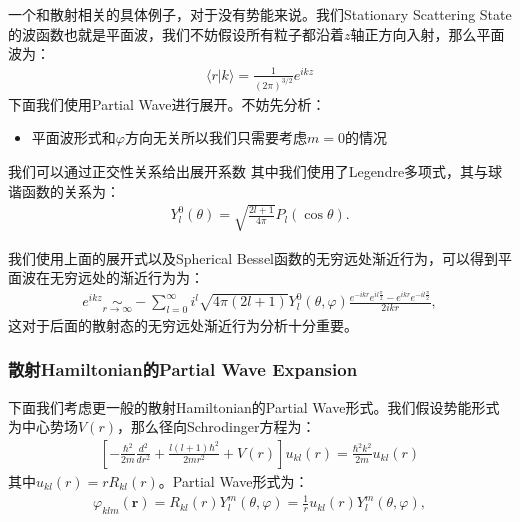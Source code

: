 一个和散射相关的具体例子，对于没有势能来说。我们Stationary Scattering
State的波函数也就是平面波，我们不妨假设所有粒子都沿着$ z $轴正方向入射，那么平面波为：
\begin{align}
  \langle r|k\rangle=\frac{1}{(2\pi)^{3/2}}e^{ikz}
\end{align}
下面我们使用Partial Wave进行展开。不妨先分析：
\begin{itemize}
  \item 平面波形式和$ \varphi $方向无关所以我们只需要考虑$ m=0 $的情况
\end{itemize}
我们可以通过正交性关系给出展开系数
其中我们使用了Legendre多项式，其与球谐函数的关系为：
\begin{align}
  Y_l^0(\theta)=\sqrt{\frac{2l+1}{4\pi}}P_l(\cos\theta).
\end{align}

\bigskip
{}

我们使用上面的展开式以及Spherical Bessel函数的无穷远处渐近行为，可以得到平面波在无穷远处的渐近行为为：
\begin{align}
  e^{ikz}\underset{r\to\infty}{\sim} - \sum_{l=0}^\infty
  i^l\sqrt{4\pi(2l+1)}
  Y^0_l(\theta,\varphi)\frac{e^{-ikr}e^{il\frac{\pi}{2}}-e^{ikr}e^{-il\frac{\pi}{2}}}{2ikr},
\end{align}
这对于后面的散射态的无穷远处渐近行为分析十分重要。

\subsubsection{散射Hamiltonian的Partial Wave Expansion}

\bigskip
{}

下面我们考虑更一般的散射Hamiltonian的Partial Wave形式。我们假设势能形式为中心势场$ V(r) $，那么径向Schrodinger方程为：
\begin{align}
  \left[-\frac{\hbar^{2}}{2m}\frac{d^{2}}{dr^{2}}+\frac{l(l+1)\hbar^{2}}{2m
  r^{2}}+V(r)\right]u_{kl}(r)=\frac{\hbar^{2}k^{2}}{2m}u_{kl}(r)
\end{align}
其中$ u_{kl}(r)=rR_{kl}(r) $。Partial Wave形式为：
\begin{align}
  \varphi_{klm}(\mathbf{r})=R_{kl}(r)Y_l^m(\theta,\varphi)=\frac{1}{r}u_{kl}(r)Y_l^m(\theta,\varphi),
\end{align}

